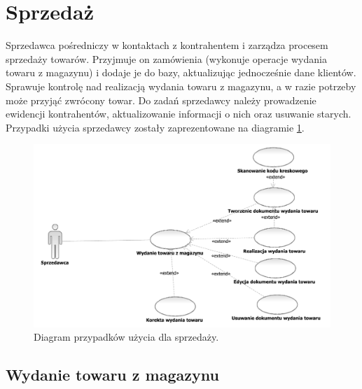 \section{Sprzedaż}
Sprzedawca pośredniczy w kontaktach z kontrahentem i zarządza procesem
sprzedaży towarów. Przyjmuje on zamówienia (wykonuje operacje wydania
towaru z magazynu) i dodaje je do bazy, aktualizując jednocześnie dane
klientów. Sprawuje kontrolę nad realizacją wydania towaru z magazynu,
a w razie potrzeby może przyjąć zwrócony towar. Do zadań sprzedawcy
należy prowadzenie ewidencji kontrahentów, aktualizowanie informacji o
nich oraz usuwanie starych. Przypadki użycia sprzedawcy zostały
zaprezentowane na diagramie \ref{fig:Sprzedaz}.

\begin{figure}[H]
  \centering
  \includegraphics[scale=0.6]{../img/usecase/Sprzedaz.pdf}
  \caption{Diagram przypadków użycia dla sprzedaży.}
  \label{fig:Sprzedaz}
\end{figure}

\newpage
\singlespacing
\subsection{Wydanie towaru z magazynu}
\begin{usecase}
\end{usecase}

